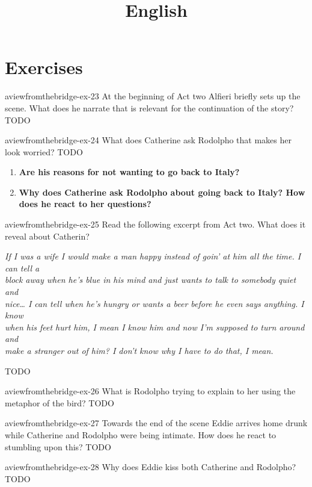\documentclass[preview]{standalone}
\begin{document}
\title{English}
\genpage

\section{Exercises}

\begin{snippetexercise}{aviewfromthebridge-ex-23}
    {At the beginning of Act two Alfieri briefly sets up the scene. What does he narrate that is relevant
    for the continuation of the story?}
    TODO
\end{snippetexercise}

\begin{snippetexercise}{aviewfromthebridge-ex-24}
    {What does Catherine ask Rodolpho that makes her look worried?}
    TODO

    \begin{enumerate}
        \item \textbf{Are his reasons for not wanting to go back to Italy?}
        \item \textbf{Why does Catherine ask Rodolpho about going back to Italy? How does he react to her
        questions?}
    \end{enumerate}
\end{snippetexercise}

\begin{snippetexercise}{aviewfromthebridge-ex-25}
    {Read the following excerpt from Act two. What does it reveal about Catherin?}
    \begin{center}
        \textit{If I was a wife I would make a man happy instead of goin' at him all the time. I can tell a} \\
        \textit{block away when he's blue in his mind and just wants to talk to somebody quiet and} \\
        \textit{nice… I can tell when he's hungry or wants a beer before he even says anything. I know} \\
        \textit{when his feet hurt him, I mean I know him and now I'm supposed to turn around and} \\
        \textit{make a stranger out of him? I don't know why I have to do that, I mean.}
    \end{center}
    TODO
\end{snippetexercise}

\begin{snippetexercise}{aviewfromthebridge-ex-26}
    {What is Rodolpho trying to explain to her using the metaphor of the bird?}
    TODO
\end{snippetexercise}

\begin{snippetexercise}{aviewfromthebridge-ex-27}
    {Towards the end of the scene Eddie arrives home drunk while Catherine and Rodolpho were being
    intimate. How does he react to stumbling upon this?}
    TODO
\end{snippetexercise}

\begin{snippetexercise}{aviewfromthebridge-ex-28}
    {Why does Eddie kiss both Catherine and Rodolpho?}
    TODO
\end{snippetexercise}
\end{document}

